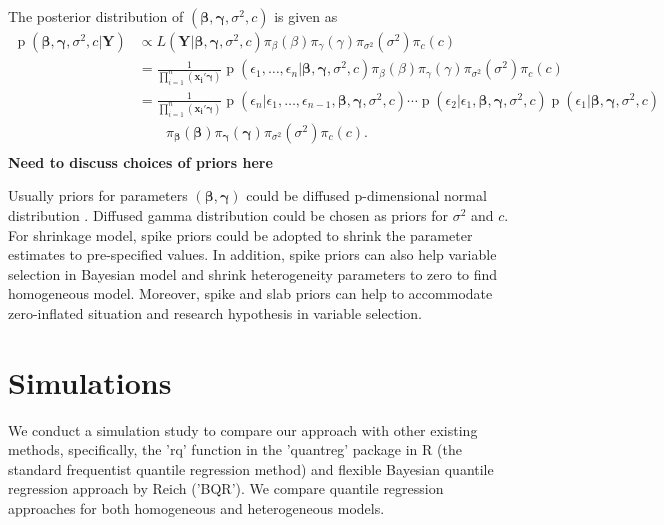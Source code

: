 \documentclass[12pt]{article}
\DeclareMathOperator{\pr}{p}
\begin{document}
The posterior distribution of $(\bm{\beta},
\bm{\gamma}, \sigma^2, c)$ is given as
\begin{align*}
  \pr(\bm{\beta}, \bm{\gamma}, \sigma^2, c|\bm{Y}) & \propto L(\bm{Y}|
  \bm{\beta}, \bm{\gamma}, \sigma^2, c) \pi_{\beta}(\beta)
  \pi_{\gamma}(\gamma) \pi_{\sigma^2}(\sigma^2) \pi_c(c) \\
  & = \frac{1}{\prod_{i=1}^n (\bm{x_i'\gamma})} \pr \left( \epsilon_1,
    \ldots, \epsilon_n | \bm{\beta}, \bm{\gamma}, \sigma^2, c\right)
  \pi_{\beta}(\beta)
  \pi_{\gamma}(\gamma) \pi_{\sigma^2}(\sigma^2) \pi_c(c) \\
  & = \frac{1}{\prod_{i=1}^n (\bm{x_i'\gamma})} \pr \left(\epsilon_n| \epsilon_1,
    \ldots, \epsilon_{n-1} , \bm{\beta}, \bm{\gamma}, \sigma^2, c\right)
  \cdots  \pr \left(\epsilon_2| \epsilon_1, \bm{\beta}, \bm{\gamma},
    \sigma^2, c\right)  \pr \left(\epsilon_1| \bm{\beta}, \bm{\gamma},
    \sigma^2, c\right)\\
  & \qquad
  \pi_{\bm{\beta}}(\bm{\beta})
  \pi_{\bm{\gamma}}(\bm{\gamma}) \pi_{\sigma^2}(\sigma^2) \pi_c(c) .\\
\end{align*}
{\bf Need to discuss choices of priors here}

Usually priors for parameters $(\bm{\beta}, \bm{\gamma})$
could be diffused p-dimensional normal distribution . Diffused gamma
distribution could be chosen as priors for $\sigma^2$ and $c$. For
shrinkage model, spike priors could be adopted to shrink the parameter
estimates to pre-specified values. In addition, spike priors can also
help variable selection in Bayesian model and shrink heterogeneity
parameters to zero to find homogeneous model. Moreover, spike and slab
priors can help to accommodate zero-inflated situation and research
hypothesis in variable selection.

\section{Simulations}
We
conduct a simulation study to compare our approach with other existing
methods, specifically, the 'rq' function in the 'quantreg' package in
R
(the standard frequentist quantile regression method) and
flexible Bayesian quantile regression approach by Reich
('BQR').
We compare quantile regression approaches
for both homogeneous and heterogeneous models.
\end{document}
